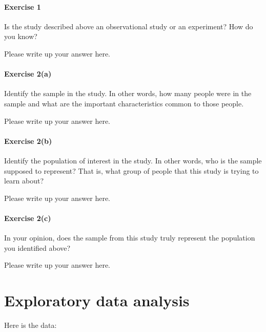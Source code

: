 \documentclass[
]{book}
\begin{document}
\hypertarget{exercise-1-6}{%
\paragraph*{Exercise 1}\label{exercise-1-6}}

Is the study described above an observational study or an experiment? How do you know?

Please write up your answer here.

\hypertarget{exercise-2a-1}{%
\paragraph*{Exercise 2(a)}\label{exercise-2a-1}}

Identify the sample in the study. In other words, how many people were in the sample and what are the important characteristics common to those people.

Please write up your answer here.

\hypertarget{exercise-2b-1}{%
\paragraph*{Exercise 2(b)}\label{exercise-2b-1}}

Identify the population of interest in the study. In other words, who is the sample supposed to represent? That is, what group of people that this study is trying to learn about?

Please write up your answer here.

\hypertarget{exercise-2c-1}{%
\paragraph*{Exercise 2(c)}\label{exercise-2c-1}}

In your opinion, does the sample from this study truly represent the population you identified above?

Please write up your answer here.

\hypertarget{randomization2-eda}{%
\section{Exploratory data analysis}\label{randomization2-eda}}

Here is the data:
\end{document}
